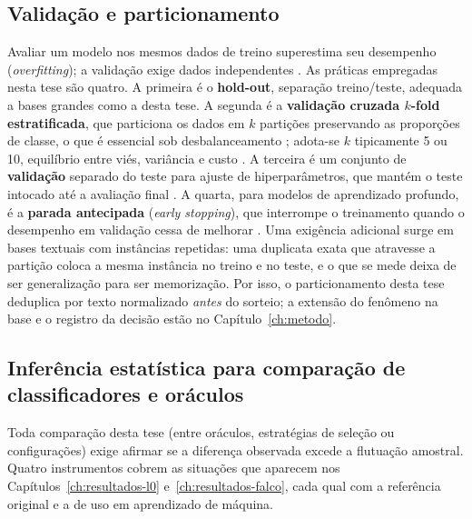 \subsection{Validação e particionamento}
\label{subsec:ml_validation}

Avaliar um modelo nos mesmos dados de treino superestima seu desempenho
(\textit{overfitting}); a validação exige dados independentes
\cite{Kohavi1995}. As práticas empregadas nesta tese são quatro. A primeira é o
\textbf{hold-out}, separação treino/teste, adequada a bases grandes como a
desta tese. A segunda é a \textbf{validação cruzada $k$-fold estratificada},
que particiona os dados em $k$ partições preservando as proporções de classe,
o que é essencial sob desbalanceamento \cite{Kohavi1995, Forman2010,
James2013, Widodo2022}; adota-se $k$ tipicamente 5 ou 10, equilíbrio entre
viés, variância e custo \cite{Nti2021, Reusens2024}. A terceira é um conjunto
de \textbf{validação} separado do teste para ajuste de hiperparâmetros, que
mantém o teste intocado até a avaliação final \cite{Bishop2006}. A quarta,
para modelos de aprendizado profundo, é a \textbf{parada antecipada}
(\textit{early stopping}), que interrompe o treinamento quando o desempenho
em validação cessa de melhorar \cite{Prechelt2012, Goodfellow2016}. Uma exigência adicional surge em
bases textuais com instâncias repetidas: uma duplicata exata que atravesse a
partição coloca a mesma instância no treino e no teste, e o que se mede deixa
de ser generalização para ser memorização. Por isso, o particionamento desta
tese deduplica por texto normalizado \emph{antes} do sorteio; a extensão do
fenômeno na base e o registro da decisão estão no Capítulo~\ref{ch:metodo}.

\subsection{Inferência estatística para comparação de classificadores e oráculos}
\label{subsec:ml_inferencia}

Toda comparação desta tese (entre oráculos, estratégias de seleção ou
configurações) exige afirmar se a diferença observada excede a flutuação
amostral. Quatro instrumentos cobrem as situações que aparecem nos
Capítulos~\ref{ch:resultados-l0} e~\ref{ch:resultados-falco}, cada qual com a
referência original e a de uso em aprendizado de máquina.

